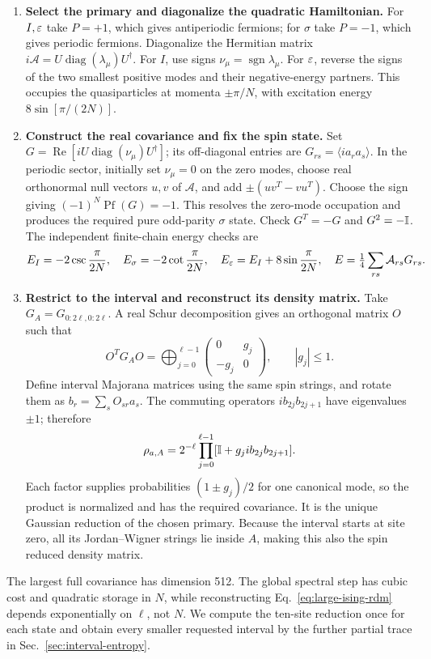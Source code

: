 \begin{enumerate}
\item \textbf{Select the primary and diagonalize the quadratic Hamiltonian.}
For $I,\varepsilon$ take $P=+1$, which gives antiperiodic fermions; for
$\sigma$ take $P=-1$, which gives periodic fermions. Diagonalize the
Hermitian matrix $i\mathcal A=U\operatorname{diag}(\lambda_\mu)U^\dagger$.
For $I$, use signs $\nu_\mu=\operatorname{sgn}\lambda_\mu$.
For $\varepsilon$, reverse the signs of the two smallest positive modes and
their negative-energy partners. This occupies the quasiparticles at
momenta $\pm\pi/N$, with excitation energy $8\sin[\pi/(2N)]$.
\item \textbf{Construct the real covariance and fix the spin state.}
Set $G=\operatorname{Re}[iU\operatorname{diag}(\nu_\mu)U^\dagger]$;
its off-diagonal entries are $G_{rs}=\langle ia_ra_s\rangle$.
In the periodic sector, initially set $\nu_\mu=0$ on the zero modes,
choose real orthonormal null vectors $u,v$ of $\mathcal A$, and add
$\pm(uv^T-vu^T)$. Choose the sign giving $(-1)^N\operatorname{Pf}(G)=-1$.
This resolves the zero-mode occupation and produces the required pure
odd-parity $\sigma$ state. Check $G^T=-G$ and $G^2=-\mathbb I$.
The independent finite-chain energy checks are
\begin{equation}
 E_I=-2\csc\frac\pi{2N},\quad E_\sigma=-2\cot\frac\pi{2N},\quad
 E_\varepsilon=E_I+8\sin\frac\pi{2N},\quad
 E=\tfrac14\sum_{rs}\mathcal A_{rs}G_{rs}.
\end{equation}
\item \textbf{Restrict to the interval and reconstruct its density matrix.}
Take $G_A=G_{0:2\ell,0:2\ell}$. A real Schur decomposition gives an
orthogonal matrix $O$ such that
\begin{equation}
 O^TG_AO=\bigoplus_{j=0}^{\ell-1}
 \begin{pmatrix}0&g_j\\-g_j&0\end{pmatrix},\qquad |g_j|\leq1.
\end{equation}
Define interval Majorana matrices using the same spin strings, and
rotate them as $b_r=\sum_sO_{sr}a_s$. The commuting operators
$ib_{2j}b_{2j+1}$ have eigenvalues $\pm1$; therefore
\begin{equation}
 \rho_{a,A}=2^{-\ell}\prod_{j=0}^{\ell-1}
      [\mathbb I+g_j i b_{2j}b_{2j+1}].
 \label{eq:large-ising-rdm}
\end{equation}
Each factor supplies probabilities $(1\pm g_j)/2$ for one canonical
mode, so the product is normalized and has the required covariance.
It is the unique Gaussian reduction of the chosen primary.
Because the interval starts at site zero, all its Jordan--Wigner strings
lie inside $A$, making this also the spin reduced density matrix.
\end{enumerate}
The largest full covariance has dimension 512. The global spectral step
has cubic cost and quadratic storage in $N$, while reconstructing
Eq.~\eqref{eq:large-ising-rdm} depends exponentially on $\ell$, not $N$.
We compute the ten-site reduction once for each state and obtain every
smaller requested interval by the further partial trace in
Sec.~\ref{sec:interval-entropy}.


